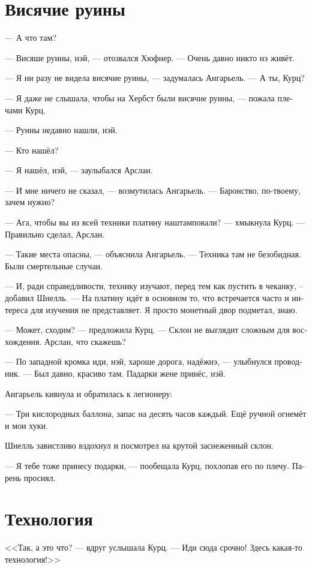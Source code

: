 \documentclass[a4paper,12pt,fleqn]{book}\usepackage{cooltooltips}\usepackage{polyglossia}\setdefaultlanguage[babelshorthands=true]{russian}\setotherlanguage{english}\defaultfontfeatures{Ligatures=TeX,Mapping=tex-text} \usepackage{xcolor}\definecolor{lightgray}{HTML}{bbbbbb}\color{lightgray}\newcommand{\ml}[3]{\textenglish{\textcolor{black}{#3}}}
\begin{document}
\section{Висячие руины}

--- А что там?

--- Висяше руины, нэй, --- отозвался Хюфнер.
--- Очень давно никто нэ живёт.

--- Я ни разу не видела висячие руины, --- задумалась Ангарьель.
--- А ты, Курц?

--- Я даже не слышала, чтобы на Хербст были висячие руины, --- пожала плечами Курц.

--- Руины недавно нашли, нэй.

--- Кто нашёл?

--- Я нашёл, нэй, --- заулыбался Арслан.

--- И мне ничего не сказал, --- возмутилась Ангарьель.
--- Баронство, по-твоему, зачем нужно?

--- Ага, чтобы вы из всей техники платину наштамповали? --- хмыкнула Курц.
--- Правильно сделал, Арслан.

--- Такие места опасны, --- объяснила Ангарьель.
--- Техника там не безобидная.
Были смертельные случаи.

--- И, ради справедливости, технику изучают, перед тем как пустить в чеканку, -- добавил Шнелль.
--- На платину идёт в основном то, что встречается часто и интереса для изучения не представляет.
Я просто монетный двор подметал, знаю.

--- Может, сходим? --- предложила Курц.
--- Склон не выглядит сложным для восхождения.
Арслан, что скажешь?

--- По западной кромка иди, нэй, хароше дорога, надёжнэ, --- улыбнулся проводник.
--- Был давно, красиво там.
Падарки жене принёс, нэй.

Ангарьель кивнула и обратилась к легионеру:

--- Три кислородных баллона, запас на десять часов каждый.
Ещё ручной огнемёт и мои хуки.

Шнелль завистливо вздохнул и посмотрел на крутой заснеженный склон.

--- Я тебе тоже принесу подарки, --- пообещала Курц, похлопав его по плечу.
Парень просиял.

\section{Технология}

<<Так, а это что? --- вдруг услышала Курц.
--- Иди сюда срочно!
Здесь какая-то технология!>>
\end{document}
